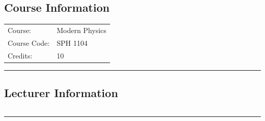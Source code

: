 
\subsection*{Course Information}
\vspace{0ex}%
\noindent\parbox{0.5\textwidth}{%
    \noindent\begin{tabular}{@{}ll}
                 \textsf{Course:}          & Modern Physics \\
                 \textsf{Course Code:}         & 	SPH 1104    \\
                 \textsf{Credits:}    & 	10
    \end{tabular}}
\vspace{2ex}\hrule\vspace{2ex}

\subsection*{Lecturer Information}
\noindent\parbox{0.5\textwidth}{%
    \noindent\begin{tabular}{@{}ll}
                 
    \end{tabular}}
\vspace{2ex}\hrule\vspace{2ex}



